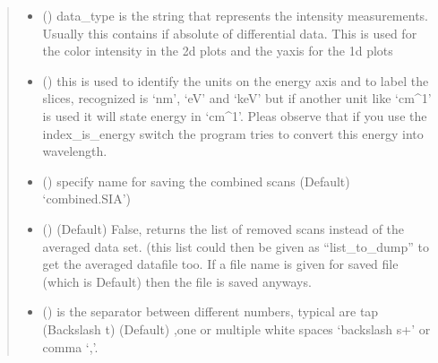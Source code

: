 \documentclass[letterpaper,10pt,english]{sphinxmanual}
\begin{document}
\begin{fulllineitems}
\begin{quote}
\begin{description}
\begin{itemize}
\item {} 
 (\sphinxstyleliteralemphasis{\sphinxupquote{ (}}\sphinxstyleliteralemphasis{\sphinxupquote{)}}) \textendash{} data\_type is the string that represents the intensity measurements. Usually this contains if absolute
of differential data. This is used for the color intensity in the 2d plots and the y\sphinxhyphen{}axis for the 1d plots

\item {} 
 (\sphinxstyleliteralemphasis{\sphinxupquote{ (}}\sphinxstyleliteralemphasis{\sphinxupquote{)}}) \textendash{} this is used to identify the units on the energy axis and to label the slices, recognized is ‘nm’, ‘eV’ and ‘keV’
but if another unit like ‘cm\textasciicircum{}\sphinxhyphen{}1’ is used it will state energy in ‘cm\textasciicircum{}\sphinxhyphen{}1’. Pleas observe that if you use the index\_is\_energy
switch the program tries to convert this energy into wavelength.

\item {} 
 (\sphinxstyleliteralemphasis{\sphinxupquote{, }}) \textendash{} specify name for saving the combined scans (Default) ‘combined.SIA’)

\item {} 
 (\sphinxstyleliteralemphasis{\sphinxupquote{, }}) \textendash{} (Default) False, returns the list of removed scans instead of the averaged data set. (this list could then be given as “list\_to\_dump” to get the averaged datafile too. If a file name is given for saved file (which is Default) then the file is saved anyways.

\item {} 
 (\sphinxstyleliteralemphasis{\sphinxupquote{ (}}\sphinxstyleliteralemphasis{\sphinxupquote{)}}) \textendash{} is the separator between different numbers, typical are tap (Backslash t) (Default) ,one or
multiple white spaces ‘backslash s+’ or comma ‘,’.


\end{itemize}
\end{description}
\end{quote}
\end{fulllineitems}
\end{document}
